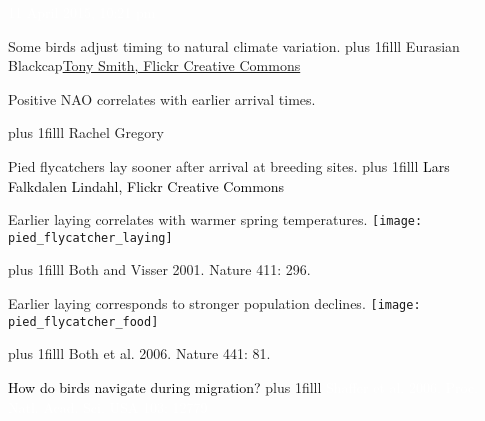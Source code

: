 \documentclass[t]{beamer}
\newcommand\imagecredit[1]{%
	\vskip0pt plus 1filll \tiny #1}%
\begin{document}
{
\begin{frame}[t,plain]{\textcolor{white}{11 April 2015, 10:21 pm}}

\end{frame}
}


{
\begin{frame}[t,plain]{Some birds adjust timing to natural climate variation.}
	\imagecredit{Eurasian Blackcap\hfill \href{https://www.flickr.com/photos/pc_plod/7145668109/}{Tony Smith, Flickr Creative Commons}}
\end{frame}
}


{
\begin{frame}[t,plain]{Positive NAO correlates with earlier arrival times.}

	\imagecredit{\hfill Rachel Gregory}
\end{frame}
}



{
\begin{frame}[t,plain]{Pied flycatchers lay sooner after arrival at breeding sites.}
	\imagecredit{\textcolor{black}{Lars Falkdalen Lindahl, Flickr Creative Commons}}
\end{frame}
}

{
\begin{frame}[t,plain]{Earlier laying correlates with warmer spring temperatures.}
	\texttt{[image: pied\_flycatcher\_laying]}

	\imagecredit{\hfill Both and Visser 2001. Nature 411: 296.}
\end{frame}
}

{
\begin{frame}[t,plain]{Earlier laying corresponds to stronger population declines.}
	\texttt{[image: pied\_flycatcher\_food]}

	\imagecredit{\hfill Both et al. 2006. Nature 441: 81.}
\end{frame}
}

{
\begin{frame}[t,plain]{\textcolor{black}{How do birds navigate during migration?}}
	\imagecredit{\hfill\textcolor{white}{Shaffer et al. 2006. Proc. Natl. Acad. Sci. USA 103: 12779}}
\end{frame}
}
\end{document}
